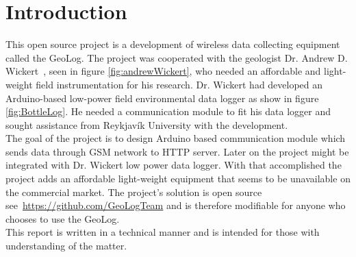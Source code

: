\section*{Introduction}
This open source project is a development of wireless data collecting equipment called the GeoLog. The project was cooperated with the geologist Dr. Andrew D. Wickert~\cite{andrewWickert}, seen in figure \ref{fig:andrewWickert}, who needed an affordable and light-weight field instrumentation for his research. Dr. Wickert had developed an Arduino-based\cite{arduinoMega}  low-power field environmental data logger as show in figure \ref{fig:BottleLog}. He needed a communication module to fit his data logger and sought assistance from Reykjavík University with the development.\\
The goal of the project is to design Arduino based communication module which sends data through GSM network to HTTP server. Later on the project might be integrated with Dr. Wickert low power data logger. With that accomplished the project adds an affordable light-weight equipment that seems to be unavailable on the commercial market. The project's solution is open source see~\url{https://github.com/GeoLogTeam} and is therefore modifiable for anyone who chooses to use the GeoLog.\\
This report is written in a technical manner and is intended for those with understanding of the matter.